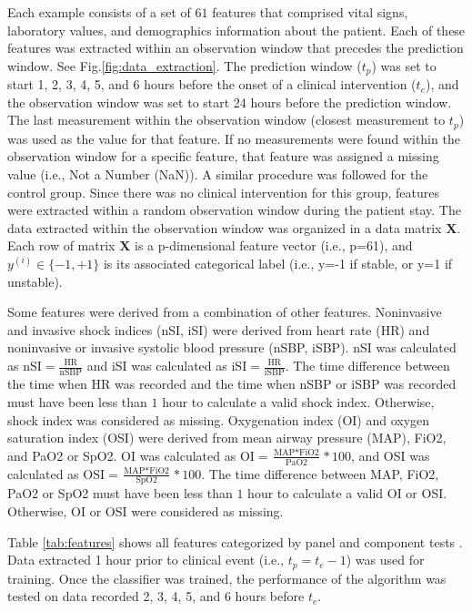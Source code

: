 \documentclass[
   technote
]{phildoc}
\newcommand{\ie}{i.e.,}
\newcommand{\fig}{Fig.}
\begin{document}
Each example consists of a set of $61$ features that comprised vital signs, laboratory values, and demographics information about the patient. Each of these features was extracted within an observation window that precedes the prediction window. See \fig{}\ref{fig:data_extraction}. The prediction window ($t_{p}$) was set to start 1, 2, 3, 4, 5, and 6 hours before the onset of a clinical intervention ($t_{e}$), and the observation window was set to start 24 hours before the prediction window. The last measurement within the observation window (closest measurement to $t_{p}$) was used as the value for that feature. If no measurements were found within the observation window for a specific feature, that feature was assigned a missing value (\ie{} Not a Number (NaN)). A similar procedure was followed for the control group. Since there was no clinical intervention for this group, features were extracted within a random observation window during the patient stay. The data extracted within the observation window was organized in a data matrix $\bm{X}$. Each row of matrix $\bm{X}$ is a p-dimensional feature vector (\ie{} p=61), and $y^{(i)}\in\{-1,+1\}$ is its associated categorical label (\ie{} y=-1 if stable, or y=1 if unstable). 

Some features were derived from a combination of other features. Noninvasive and invasive shock indices (nSI, iSI) were derived from heart rate (HR) and noninvasive or invasive systolic blood pressure (nSBP, iSBP). nSI was calculated as $\text{nSI} = \frac{\text{HR}}{\text{nSBP}}$ and iSI was calculated as $\text{iSI} = \frac{\text{HR}}{\text{iSBP}}$. The time difference between the time when HR was recorded and the time when nSBP or iSBP was recorded must have been less than $1$ hour to calculate a valid shock index. Otherwise, shock index was considered as missing. Oxygenation index (OI) and oxygen saturation index (OSI) were derived from mean airway pressure (MAP), FiO2, and PaO2 or SpO2. OI was calculated as $\text{OI} = \frac{\text{MAP}*\text{FiO2}}{\text{PaO2}}*100$, and OSI was calculated as $\text{OSI} = \frac{\text{MAP}*\text{FiO2}}{\text{SpO2}}*100$. The time difference between MAP, FiO2, PaO2 or SpO2 must have been less than $1$ hour to calculate a valid OI or OSI. Otherwise, OI or OSI were considered as missing. 

Table \ref{tab:features} shows all features categorized by panel and component tests \cite{Frassica:2005}. Data extracted 1 hour prior to clinical event (\ie{} $t_{p}= t_{e} - 1$) was used for training. Once the classifier was trained, the performance of the algorithm was tested on data recorded 2, 3, 4, 5, and 6 hours before $t_{e}$.
\end{document}
